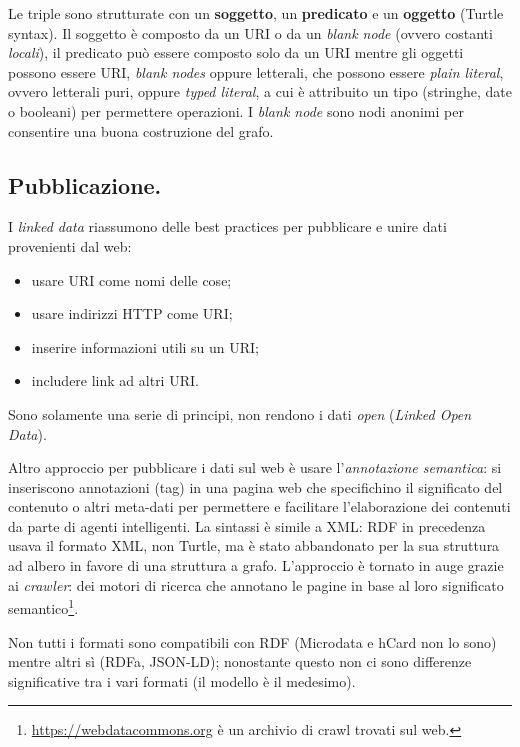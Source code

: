 \documentclass[11pt]{article}
\begin{document}
Le triple sono strutturate con un \textbf{soggetto}, un \textbf{predicato} e un \textbf{oggetto} (Turtle syntax).
Il soggetto è composto da un URI o da un \textit{blank node} (ovvero costanti \textit{locali}), il predicato può essere composto solo da un URI mentre gli oggetti possono essere URI, \textit{blank nodes} oppure letterali, che possono essere \textit{plain literal}, ovvero letterali puri, oppure \textit{typed literal}, a cui è attribuito un tipo (stringhe, date o booleani) per permettere operazioni.
I \textit{blank node} sono nodi anonimi per consentire una buona costruzione del grafo.

\subsection{Pubblicazione.}
I \textit{linked data} riassumono delle best practices per pubblicare e unire dati provenienti dal web:
\begin{itemize}
  \item usare URI come nomi delle cose;
  \item usare indirizzi HTTP come URI;
  \item inserire informazioni utili su un URI;
  \item includere link ad altri URI.
\end{itemize}
Sono solamente una serie di principi, non rendono i dati \textit{open} (\textit{Linked Open Data}). \newline

Altro approccio per pubblicare i dati sul web è usare l'\textit{annotazione semantica}: si inseriscono annotazioni (tag) in una pagina web che specifichino il significato del contenuto o altri meta-dati per permettere e facilitare l'elaborazione dei contenuti da parte di agenti intelligenti.
La sintassi è simile a XML: RDF in precedenza usava il formato XML, non Turtle, ma è stato abbandonato per la sua struttura ad albero in favore di una struttura a grafo.
L'approccio è tornato in auge grazie ai \textit{crawler}: dei motori di ricerca che annotano le pagine in base al loro significato semantico\footnote{\url{https://webdatacommons.org} è un archivio di crawl trovati sul web.}.

Non tutti i formati sono compatibili con RDF (Microdata e hCard non lo sono) mentre altri sì (RDFa, JSON-LD); nonostante questo non ci sono differenze significative tra i vari formati (il modello è il medesimo).
\end{document}
